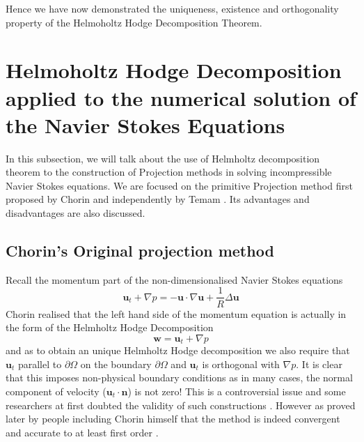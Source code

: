 Hence we have now demonstrated the uniqueness, existence and orthogonality property of the Helmoholtz Hodge Decomposition Theorem.

\newpage
\section[HHD applied to the Navier Stokes Equations]{Helmoholtz Hodge Decomposition applied to the numerical solution of the Navier Stokes Equations}
In this subsection, we will talk about the use of Helmholtz decomposition theorem to the construction of Projection methods in solving incompressible Navier Stokes equations. We are focused on the primitive Projection method first proposed by Chorin and independently by Temam \cite{chorin1968numerical,temam1969approximation,brown2001accurate}. Its advantages and disadvantages are also discussed.\\

\subsection{Chorin's Original projection method}
Recall the momentum part of the non-dimensionalised Navier Stokes equations
\begin{equation}\label{eq:momentum equation}
\textbf{u}_t + \nabla \textit{p} = - \textbf{u} \cdot \nabla \textbf{u} + \dfrac{1}{R} \Delta \textbf{u}
\end{equation}
Chorin realised that the left hand side of the momentum equation is actually in the form of the Helmholtz Hodge Decomposition \cite{chorin1968numerical,chorin1990mathematical,brown2001accurate}
\begin{equation}
\textbf{w} = \textbf{u}_t + \nabla \textit{p} 
\end{equation}
and as to obtain an unique Helmholtz Hodge decomposition we also require that $\textbf{u}_t$ parallel to $\partial \Omega$ on the boundary $\partial \Omega$ and $\textbf{u}_t$ is orthogonal with $\nabla p$. It is clear that this imposes non-physical boundary conditions as in many cases, the normal component of velocity ($\textbf{u}_t \cdot \textbf{n}$) is not zero! This is a controversial issue and some researchers at first doubted the validity of such constructions \cite{perot1993analysis,brown2001accurate,shen1992error}. However as proved later by people including Chorin himself that the method is indeed convergent and accurate to at least first order \cite{chorin1969convergence,shen1992error,rannacher1992chorin,perot1993analysis,brown2001accurate}. 

